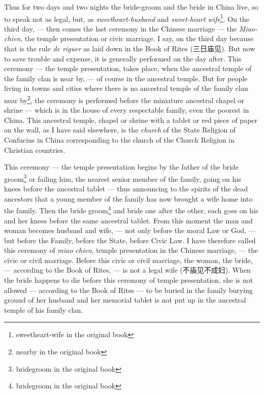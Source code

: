 Thus for two days and two nights the bride-groom and the bride in China live, so to speak not as legal, but, as \emph{sweetheart-husband} and \emph{sweet-heart wife}\footnote{sweetheart-wife in the original book}.
On the third day, --- then comes the last ceremony in the Chinese marriage --- the \emph{Miao-chien}, the temple presentation or civic marriage.
I say, on the third day because that is the rule \emph{de riguer}  as laid down in the Book of Rites (三日庙见). 
But now to save trouble and expense, it is generally performed on the day after.
This ceremony --- the temple presentation, takes place, when the ancestral temple of the family clan is near by, --- of course in the ancestral temple.
But for people living in towns and cities where there is no ancestral temple of the family clan near by\footnote{nearby in the original book}, the ceremony is performed before the miniature ancestral chapel or shrine --- which is in the house of every respectable family, even the poorest in China.
This ancestral temple, chapel or shrine with a tablet or red piece of paper on the wall, as I have said elsewhere, is the \emph{church} of the State Religion of Confucius in China corresponding to the church of the Church Religion in Christian countries.

This ceremony --- the temple presentation begins by the father of the bride groom\footnote{bridegroom in the original book}  or failing him, the nearest senior member of the family, going on his knees before the ancestral tablet --- thus announcing to the spirits of the dead ancestors that a young member of the family has now brought a wife home into the family.
Then the bride groom\footnote{bridegroom in the original book}  and bride one after the other, each goes on his and her knees before the same ancestral tablet.
From this moment the man and woman becomes husband and wife, --- not only before the moral Law or God, --- but before the Family, before the State, before Civic Law.
I have therefore called this ceremony of \emph{miao chien}, temple presentation in the Chinese marriage, --- the civic or civil marriage.
Before this civic or civil marriage, the woman, the bride, --- according to the Book of Rites, --- is not a legal wife (不庙见不成妇).
When the bride happens to die before this ceremony of temple presentation, she is not allowed --- according to the Book of Rites --- to be buried in the family burying ground of her husband and her memorial tablet is not put up in the ancestral temple of his family clan.

